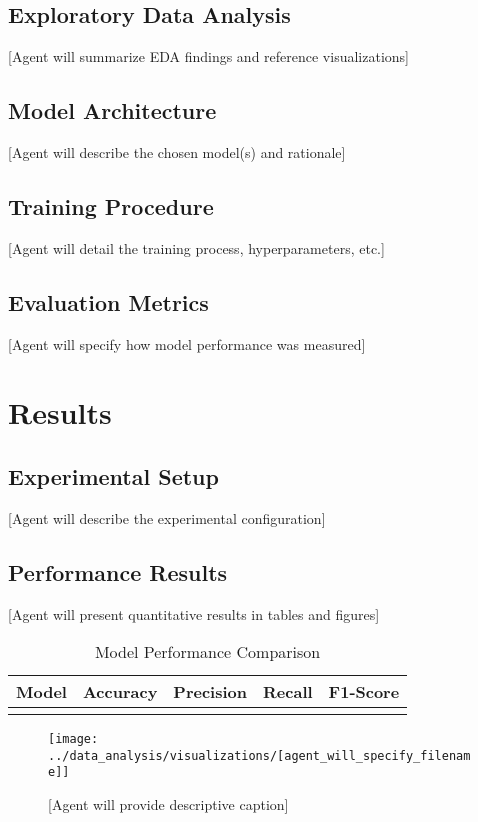 \documentclass[11pt,a4paper]{article}
\begin{document}
\subsection{Exploratory Data Analysis}
[Agent will summarize EDA findings and reference visualizations]

\subsection{Model Architecture}
[Agent will describe the chosen model(s) and rationale]

\subsection{Training Procedure}
[Agent will detail the training process, hyperparameters, etc.]

\subsection{Evaluation Metrics}
[Agent will specify how model performance was measured]

\section{Results}

\subsection{Experimental Setup}
[Agent will describe the experimental configuration]

\subsection{Performance Results}
[Agent will present quantitative results in tables and figures]

\begin{table}[H]
\centering
\caption{Model Performance Comparison}
\begin{tabular}{@{}lcccc@{}}
\toprule
Model & Accuracy & Precision & Recall & F1-Score \\
\midrule
[Agent will fill with actual results] & & & & \\
\bottomrule
\end{tabular}
\label{tab:results}
\end{table}

\begin{figure}[H]
\centering
\texttt{[image: ../data\_analysis/visualizations/[agent\_will\_specify\_filename]]}
\caption{[Agent will provide descriptive caption]}
\label{fig:example}
\end{figure}
\end{document}
